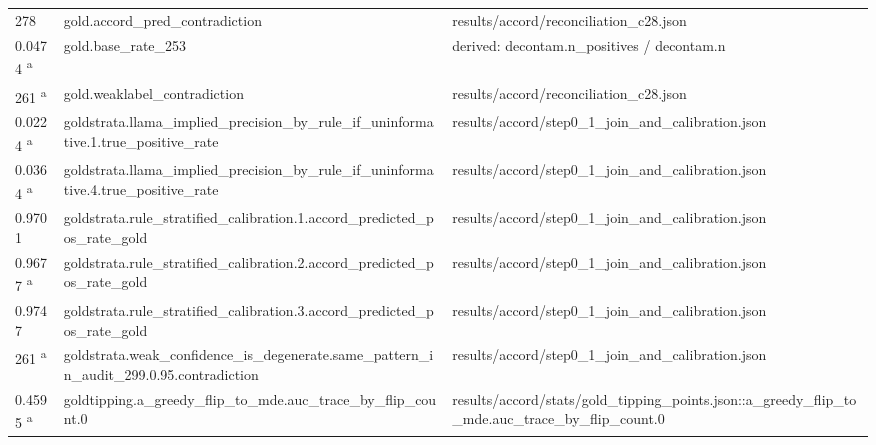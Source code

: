 \begin{longtable}{@{}p{0.7in}p{1.9in}p{2.6in}@{}}
278 & gold.\allowbreak{}accord\_pred\_contradiction & results/\allowbreak{}accord/\allowbreak{}reconciliation\_c28.\allowbreak{}json\\
0.0474 \textsuperscript{a} & gold.\allowbreak{}base\_rate\_253 & derived: decontam.\allowbreak{}n\_positives /\allowbreak{} decontam.\allowbreak{}n\\
261 \textsuperscript{a} & gold.\allowbreak{}weaklabel\_contradiction & results/\allowbreak{}accord/\allowbreak{}reconciliation\_c28.\allowbreak{}json\\
0.0224 \textsuperscript{a} & goldstrata.\allowbreak{}llama\_implied\_precision\_by\_rule\_if\_uninformative.\allowbreak{}1.\allowbreak{}true\_positive\_rate & results/\allowbreak{}accord/\allowbreak{}step0\_1\_join\_and\_calibration.\allowbreak{}json\\
0.0364 \textsuperscript{a} & goldstrata.\allowbreak{}llama\_implied\_precision\_by\_rule\_if\_uninformative.\allowbreak{}4.\allowbreak{}true\_positive\_rate & results/\allowbreak{}accord/\allowbreak{}step0\_1\_join\_and\_calibration.\allowbreak{}json\\
0.9701 & goldstrata.\allowbreak{}rule\_stratified\_calibration.\allowbreak{}1.\allowbreak{}accord\_predicted\_pos\_rate\_gold & results/\allowbreak{}accord/\allowbreak{}step0\_1\_join\_and\_calibration.\allowbreak{}json\\
0.9677 \textsuperscript{a} & goldstrata.\allowbreak{}rule\_stratified\_calibration.\allowbreak{}2.\allowbreak{}accord\_predicted\_pos\_rate\_gold & results/\allowbreak{}accord/\allowbreak{}step0\_1\_join\_and\_calibration.\allowbreak{}json\\
0.9747 & goldstrata.\allowbreak{}rule\_stratified\_calibration.\allowbreak{}3.\allowbreak{}accord\_predicted\_pos\_rate\_gold & results/\allowbreak{}accord/\allowbreak{}step0\_1\_join\_and\_calibration.\allowbreak{}json\\
261 \textsuperscript{a} & goldstrata.\allowbreak{}weak\_confidence\_is\_degenerate.\allowbreak{}same\_pattern\_in\_audit\_299.\allowbreak{}0.\allowbreak{}95.\allowbreak{}contradiction & results/\allowbreak{}accord/\allowbreak{}step0\_1\_join\_and\_calibration.\allowbreak{}json\\
0.4595 \textsuperscript{a} & goldtipping.\allowbreak{}a\_greedy\_flip\_to\_mde.\allowbreak{}auc\_trace\_by\_flip\_count.\allowbreak{}0 & results/\allowbreak{}accord/\allowbreak{}stats/\allowbreak{}gold\_tipping\_points.\allowbreak{}json::a\_greedy\_flip\_to\_mde.\allowbreak{}auc\_trace\_by\_flip\_count.\allowbreak{}0\\

\end{longtable}
